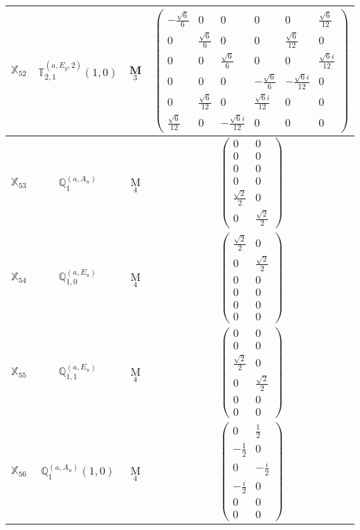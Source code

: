 \documentclass[fleqn,10pt,landscape]{article}
\begin{document}
\begin{itemize}
\begin{center}
\begin{longtable}{c|c|c|c}
$ \mathbb{X}_{52} $ & $\mathbb{T}_{2,1}^{(a,E_{g},2)}(1,0)$ & M$_{3}$ & $\begin{pmatrix} - \frac{\sqrt{6}}{6} & 0 & 0 & 0 & 0 & \frac{\sqrt{6}}{12} \\ 0 & \frac{\sqrt{6}}{6} & 0 & 0 & \frac{\sqrt{6}}{12} & 0 \\ 0 & 0 & \frac{\sqrt{6}}{6} & 0 & 0 & \frac{\sqrt{6} i}{12} \\ 0 & 0 & 0 & - \frac{\sqrt{6}}{6} & - \frac{\sqrt{6} i}{12} & 0 \\ 0 & \frac{\sqrt{6}}{12} & 0 & \frac{\sqrt{6} i}{12} & 0 & 0 \\ \frac{\sqrt{6}}{12} & 0 & - \frac{\sqrt{6} i}{12} & 0 & 0 & 0 \end{pmatrix}$ \\ \hline
$ \mathbb{X}_{53} $ & $\mathbb{Q}_{1}^{(a,A_{u})}$ & M$_{4}$ & $\begin{pmatrix} 0 & 0 \\ 0 & 0 \\ 0 & 0 \\ 0 & 0 \\ \frac{\sqrt{2}}{2} & 0 \\ 0 & \frac{\sqrt{2}}{2} \end{pmatrix}$ \\
$ \mathbb{X}_{54} $ & $\mathbb{Q}_{1,0}^{(a,E_{u})}$ & M$_{4}$ & $\begin{pmatrix} \frac{\sqrt{2}}{2} & 0 \\ 0 & \frac{\sqrt{2}}{2} \\ 0 & 0 \\ 0 & 0 \\ 0 & 0 \\ 0 & 0 \end{pmatrix}$ \\
$ \mathbb{X}_{55} $ & $\mathbb{Q}_{1,1}^{(a,E_{u})}$ & M$_{4}$ & $\begin{pmatrix} 0 & 0 \\ 0 & 0 \\ \frac{\sqrt{2}}{2} & 0 \\ 0 & \frac{\sqrt{2}}{2} \\ 0 & 0 \\ 0 & 0 \end{pmatrix}$ \\
$ \mathbb{X}_{56} $ & $\mathbb{Q}_{1}^{(a,A_{u})}(1,0)$ & M$_{4}$ & $\begin{pmatrix} 0 & \frac{1}{2} \\ - \frac{1}{2} & 0 \\ 0 & - \frac{i}{2} \\ - \frac{i}{2} & 0 \\ 0 & 0 \\ 0 & 0 \end{pmatrix}$ \\

\end{longtable}
\end{center}
\end{itemize}
\end{document}
